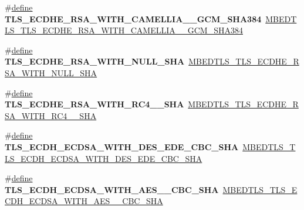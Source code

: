\begin{DoxyCompactItemize}
\item 
\mbox{\label{compat-1_83_8h_ab691f2a1123765e0df9c36f52dbd746e}} 
\#\hyperlink{structdefine}{define} {\bfseries T\+L\+S\+\_\+\+E\+C\+D\+H\+E\+\_\+\+R\+S\+A\+\_\+\+W\+I\+T\+H\+\_\+\+C\+A\+M\+E\+L\+L\+I\+A\+\_\+\_\+\+G\+C\+M\+\_\+\+S\+H\+A384}~\hyperlink{ssl__ciphersuites_8h_a3ca0c1514848eb8dbd636052c7e9b7a6}{M\+B\+E\+D\+T\+L\+S\+\_\+\+T\+L\+S\+\_\+\+E\+C\+D\+H\+E\+\_\+\+R\+S\+A\+\_\+\+W\+I\+T\+H\+\_\+\+C\+A\+M\+E\+L\+L\+I\+A\+\_\+\_\+\+G\+C\+M\+\_\+\+S\+H\+A384}
\item 
\mbox{\label{compat-1_83_8h_abb06a95e3e9f2a98ab747ad8272188ad}} 
\#\hyperlink{structdefine}{define} {\bfseries T\+L\+S\+\_\+\+E\+C\+D\+H\+E\+\_\+\+R\+S\+A\+\_\+\+W\+I\+T\+H\+\_\+\+N\+U\+L\+L\+\_\+\+S\+HA}~\hyperlink{ssl__ciphersuites_8h_a6a3b1aaac1798df68b54a88229222476}{M\+B\+E\+D\+T\+L\+S\+\_\+\+T\+L\+S\+\_\+\+E\+C\+D\+H\+E\+\_\+\+R\+S\+A\+\_\+\+W\+I\+T\+H\+\_\+\+N\+U\+L\+L\+\_\+\+S\+HA}
\item 
\mbox{\label{compat-1_83_8h_ad9243148f8f1b15e127b5f26937eb459}} 
\#\hyperlink{structdefine}{define} {\bfseries T\+L\+S\+\_\+\+E\+C\+D\+H\+E\+\_\+\+R\+S\+A\+\_\+\+W\+I\+T\+H\+\_\+\+R\+C4\+\_\+\_\+\+S\+HA}~\hyperlink{ssl__ciphersuites_8h_abdbb224bb71f7daae7035735c8608af2}{M\+B\+E\+D\+T\+L\+S\+\_\+\+T\+L\+S\+\_\+\+E\+C\+D\+H\+E\+\_\+\+R\+S\+A\+\_\+\+W\+I\+T\+H\+\_\+\+R\+C4\+\_\+\_\+\+S\+HA}
\item 
\mbox{\label{compat-1_83_8h_a0dbc6ba5cbc0ace16bb0590f8bab004e}} 
\#\hyperlink{structdefine}{define} {\bfseries T\+L\+S\+\_\+\+E\+C\+D\+H\+\_\+\+E\+C\+D\+S\+A\+\_\+\+W\+I\+T\+H\+\_\+D\+E\+S\+\_\+\+E\+D\+E\+\_\+\+C\+B\+C\+\_\+\+S\+HA}~\hyperlink{ssl__ciphersuites_8h_a01387460cc5c7c9572d108fcf849a8b6}{M\+B\+E\+D\+T\+L\+S\+\_\+\+T\+L\+S\+\_\+\+E\+C\+D\+H\+\_\+\+E\+C\+D\+S\+A\+\_\+\+W\+I\+T\+H\+\_\+D\+E\+S\+\_\+\+E\+D\+E\+\_\+\+C\+B\+C\+\_\+\+S\+HA}
\item 
\mbox{\label{compat-1_83_8h_a809a74c346fd5e9b0e614304cadb3e00}} 
\#\hyperlink{structdefine}{define} {\bfseries T\+L\+S\+\_\+\+E\+C\+D\+H\+\_\+\+E\+C\+D\+S\+A\+\_\+\+W\+I\+T\+H\+\_\+\+A\+E\+S\+\_\+\_\+\+C\+B\+C\+\_\+\+S\+HA}~\hyperlink{ssl__ciphersuites_8h_a9d638fe24554ba5c96737ab572f022ac}{M\+B\+E\+D\+T\+L\+S\+\_\+\+T\+L\+S\+\_\+\+E\+C\+D\+H\+\_\+\+E\+C\+D\+S\+A\+\_\+\+W\+I\+T\+H\+\_\+\+A\+E\+S\+\_\+\_\+\+C\+B\+C\+\_\+\+S\+HA}

\end{DoxyCompactItemize}
